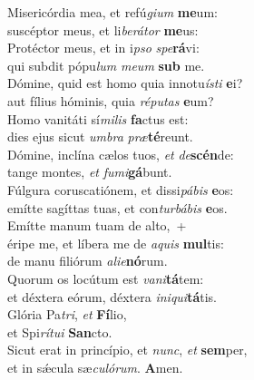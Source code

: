 \evenverse Misericórdia mea, et refú\textit{gi}\textit{um} \textbf{me}um:~\*\\
\evenverse suscéptor meus, et li\textit{be}\textit{rá}\textit{tor} \textbf{me}us:\\
\oddverse Protéctor meus, et in i\textit{pso} \textit{spe}\textbf{rá}vi:~\*\\
\oddverse qui subdit pópu\textit{lum} \textit{me}\textit{um} \textbf{sub} me.\\
\evenverse Dómine, quid est homo quia innotu\textit{í}\textit{sti} \textbf{e}i?~\*\\
\evenverse aut fílius hóminis, quia \textit{ré}\textit{pu}\textit{tas} \textbf{e}um?\\
\oddverse Homo vanitáti sí\textit{mi}\textit{lis} \textbf{fa}ctus est:~\*\\
\oddverse dies ejus sicut \textit{um}\textit{bra} \textit{præ}\textbf{té}reunt.\\
\evenverse Dómine, inclína cælos tuos, \textit{et} \textit{de}\textbf{scén}de:~\*\\
\evenverse tange montes, \textit{et} \textit{fu}\textit{mi}\textbf{gá}bunt.\\
\oddverse Fúlgura coruscatiónem, et dissi\textit{pá}\textit{bis} \textbf{e}os:~\*\\
\oddverse emítte sagíttas tuas, et con\textit{tur}\textit{bá}\textit{bis} \textbf{e}os.\\
\evenverse Emítte manum tuam de alto,~+\\
\evenverse  éripe me, et líbera me de \textit{a}\textit{quis} \textbf{mul}tis:~\*\\
\evenverse de manu filiórum \textit{a}\textit{li}\textit{e}\textbf{nó}rum.\\
\oddverse Quorum os locútum est \textit{va}\textit{ni}\textbf{tá}tem:~\*\\
\oddverse et déxtera eórum, déxtera \textit{i}\textit{ni}\textit{qui}\textbf{tá}tis.\\
\evenverse Glória Pa\textit{tri}, \textit{et} \textbf{Fí}lio,~\*\\
\evenverse et Spi\textit{rí}\textit{tu}\textit{i} \textbf{San}cto.\\
\oddverse Sicut erat in princípio, et \textit{nunc}, \textit{et} \textbf{sem}per,~\*\\
\oddverse et in sǽcula sæ\textit{cu}\textit{ló}\textit{rum}. \textbf{A}men.\\

